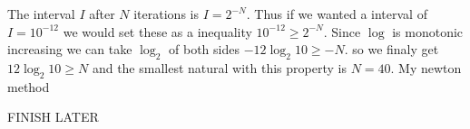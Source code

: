 \documentclass[12pt]{article}
\makeatletter
\theoremstyle{homework}
\newenvironment{exercise}[1]
{\def\@currentlabel{#1}\exercisecore}
{\endexercisecore}
\makeatother
\begin{document}
The interval $I$ after $N$ iterations is $I=2^{-N}$.  Thus if we wanted a interval of $I=10^{-12}$ we would set these as a inequality $10^{-12}\ge 2^{-N}$.  Since $\log$ is monotonic increasing we can take $\log_2$ of both sides $-12\log_2 10\ge -N$.  so we finaly get $12\log_2 10\ge N$ and the smallest natural with this property is $N=40$.
\newpage
\begin{exercise}{Chapter 4: 2(b)}
\end{exercise}
My newton method


FINISH LATER
\newpage
\begin{exercise}{Chapter 4: 18}
\end{exercise}
\end{document}
